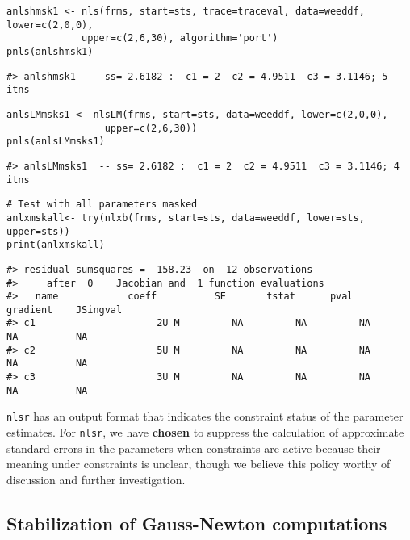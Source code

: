\begin{verbatim}
anlshmsk1 <- nls(frms, start=sts, trace=traceval, data=weeddf, lower=c(2,0,0),
             upper=c(2,6,30), algorithm='port')
pnls(anlshmsk1)
\end{verbatim}

\begin{verbatim}
#> anlshmsk1  -- ss= 2.6182 :  c1 = 2  c2 = 4.9511  c3 = 3.1146; 5  itns
\end{verbatim}

\begin{verbatim}
anlsLMmsks1 <- nlsLM(frms, start=sts, data=weeddf, lower=c(2,0,0),
                 upper=c(2,6,30))
pnls(anlsLMmsks1)
\end{verbatim}

\begin{verbatim}
#> anlsLMmsks1  -- ss= 2.6182 :  c1 = 2  c2 = 4.9511  c3 = 3.1146; 4  itns
\end{verbatim}

\begin{verbatim}
# Test with all parameters masked
anlxmskall<- try(nlxb(frms, start=sts, data=weeddf, lower=sts, upper=sts))
print(anlxmskall)
\end{verbatim}

\begin{verbatim}
#> residual sumsquares =  158.23  on  12 observations
#>     after  0    Jacobian and  1 function evaluations
#>   name            coeff          SE       tstat      pval      gradient    JSingval   
#> c1                     2U M         NA         NA         NA          NA          NA  
#> c2                     5U M         NA         NA         NA          NA          NA  
#> c3                     3U M         NA         NA         NA          NA          NA
\end{verbatim}

\texttt{nlsr} has an output format that indicates the constraint status of the parameter
estimates. For \texttt{nlsr}, we have \textbf{chosen} to suppress the calculation of
approximate standard errors in the parameters when constraints are active because
their meaning under constraints is unclear, though we believe this
policy worthy of discussion and further investigation.

\hypertarget{stabilization-of-gauss-newton-computations}{%
\subsection{Stabilization of Gauss-Newton computations}\label{stabilization-of-gauss-newton-computations}}

